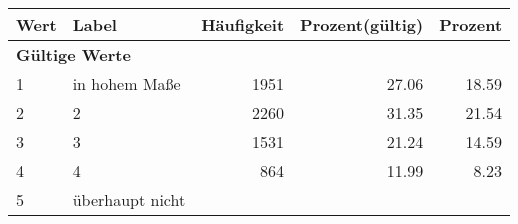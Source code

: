      \begin{longtable}{lXrrr}
     \toprule
     \textbf{Wert} & \textbf{Label} & \textbf{Häufigkeit} & \textbf{Prozent(gültig)} & \textbf{Prozent} \\
     \endhead
     \midrule
     \multicolumn{5}{l}{\textbf{Gültige Werte}}\\

     1 &
     \multicolumn{1}{X}{ in hohem Maße   } &


       \num{1951} &
       \num[round-mode=places,round-precision=2]{27,06} &
         \num[round-mode=places,round-precision=2]{18,59} \\

     2 &
     \multicolumn{1}{X}{ 2   } &


       \num{2260} &
       \num[round-mode=places,round-precision=2]{31,35} &
         \num[round-mode=places,round-precision=2]{21,54} \\

     3 &
     \multicolumn{1}{X}{ 3   } &


       \num{1531} &
       \num[round-mode=places,round-precision=2]{21,24} &
         \num[round-mode=places,round-precision=2]{14,59} \\

     4 &
     \multicolumn{1}{X}{ 4   } &


       \num{864} &
       \num[round-mode=places,round-precision=2]{11,99} &
         \num[round-mode=places,round-precision=2]{8,23} \\

     5 &
     \multicolumn{1}{X}{ überhaupt nicht   } &



\end{longtable}

